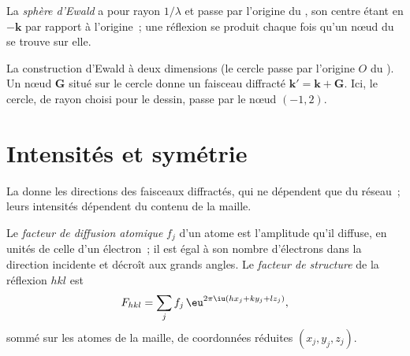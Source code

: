 \begin{definition}\label{def:b3:x-ray-diffraction:ewald}
La \emph{sphère d'Ewald} a pour rayon
$1/\lambda$ et passe par l'origine du , son centre étant
en $-\mathbf k$ par rapport à l'origine~; une réflexion se produit chaque
fois qu'un nœud du  se trouve sur elle.
\end{definition}

\begin{omfigure}

{\small La construction d'Ewald à deux dimensions (le cercle passe par
l'origine $O$ du ). Un nœud $\mathbf G$ situé sur le
cercle donne un faisceau diffracté $\mathbf k' = \mathbf k + \mathbf G$.
Ici, le cercle, de rayon choisi pour le dessin, passe par le nœud
$(-1, 2)$.}
\end{omfigure}

\section{Intensités et symétrie}

La  donne les directions des faisceaux diffractés, qui ne
dépendent que du réseau~; leurs intensités dépendent du contenu de la
maille.

\begin{definition}\label{def:b3:x-ray-diffraction:structure-factor}
Le \emph{facteur de diffusion atomique} $f_j$ d'un
atome est l'amplitude qu'il diffuse, en unités de celle d'un électron~;
il est égal à son nombre d'électrons dans la direction incidente et
décroît aux grands angles. Le \emph{facteur de structure}
de la réflexion $hkl$ est
\[
F_{hkl} = \sum_jf_j\,\eu^{2\pi\iu(hx_j + ky_j + lz_j)},
\]
sommé sur les atomes de la maille, de coordonnées réduites $(x_j, y_j, z_j)$.
\end{definition}

